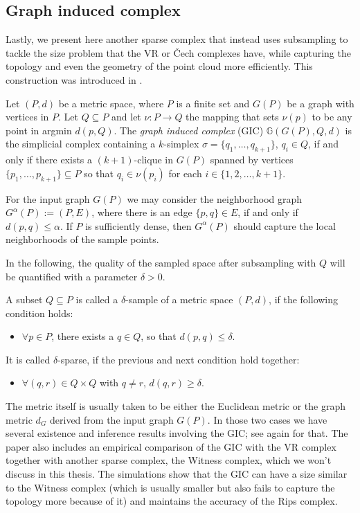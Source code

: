 \subsection{Graph induced complex}
Lastly, we present here another sparse complex that instead uses subsampling to tackle the size problem that the VR or Čech complexes have, while capturing the topology and even the geometry of the point cloud more efficiently. This construction was introduced in \cite{dey2013graphinducedcomplexpoint}.

\begin{definition}
  Let $(P,d)$ be a metric space, where $P$ is a finite set and $G(P)$ be a graph with vertices in $P$. Let $Q \subseteq P$ and let $\nu : P \to Q$ the mapping that sets $\nu(p)$ to be any point in argmin $d(p,Q)$. The \textit{graph induced complex} (GIC) $\mathbb{G}(G(P),Q,d)$ is the simplicial complex containing a $k$-simplex $\sigma=\{q_{1}, \ldots, q_{k+1}\}$, $q_{i} \in Q$, if and only if there exists a $(k+1)$-clique in $G(P)$ spanned by vertices $\{p_{1}, \ldots, p_{k+1}\} \subseteq P$ so that $q_{i} \in \nu(p_{i})$ for each $i \in \{1,2, \ldots, k+1\}$.
\end{definition}

For the input graph $G(P)$ we may consider the neighborhood graph $G^{\alpha}(P) := (P,E)$, where there is an edge $\{p,q\} \in E$, if and only if $d(p,q) \leq \alpha$. If $P$ is sufficiently dense, then $G^{\alpha}(P)$ should capture the local neighborhoods of the sample points.

In the following, the quality of the sampled space after subsampling with $Q$ will be quantified with a parameter $\delta > 0$.

\begin{definition}
  A subset $Q \subseteq P$ is called a $\delta$-sample of a metric space $(P,d)$, if the following condition holds:
  \begin{itemize}
          \item $\forall p \in P$, there exists a $q \in Q$, so that $d(p,q) \leq \delta$.
  \end{itemize}
  It is called $\delta$-sparse, if the previous and next condition hold together:
 \begin{itemize}
   \item $\forall (q,r) \in Q \times Q$ with $q \neq r$, $d(q,r) \geq \delta$.
  \end{itemize}
\end{definition}
The metric itself is usually taken to be either the Euclidean metric or the graph metric $d_{G}$ derived from the input graph $G(P)$. In those two cases we have several existence and inference results involving the GIC; see \cite{dey2013graphinducedcomplexpoint} again for that. The paper also includes an empirical comparison of the GIC with the VR complex together with another sparse complex, the Witness complex, which we won't discuss in this thesis. The simulations show that the GIC can have a size similar to the Witness complex (which is usually smaller but also fails to capture the topology more because of it) and maintains the accuracy of the Rips complex.

